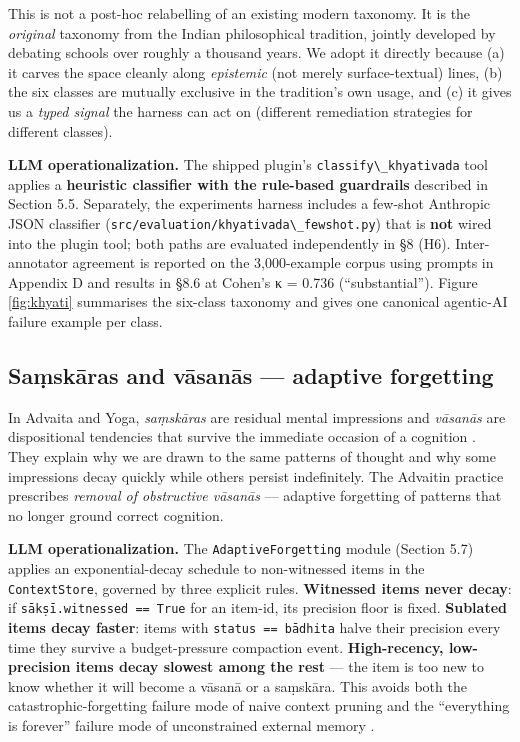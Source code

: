 This is not a post-hoc relabelling of an existing modern taxonomy. It is the \emph{original} taxonomy from the Indian philosophical tradition, jointly developed by debating schools over roughly a thousand years. We adopt it directly because (a) it carves the space cleanly along \emph{epistemic} (not merely surface-textual) lines, (b) the six classes are mutually exclusive in the tradition's own usage, and (c) it gives us a \emph{typed signal} the harness can act on (different remediation strategies for different classes).

\textbf{LLM operationalization.} The shipped plugin's \passthrough{\lstinline!classify\_khyativada!} tool applies a \textbf{heuristic classifier with the rule-based guardrails} described in Section 5.5. Separately, the experiments harness includes a few-shot Anthropic JSON classifier (\passthrough{\lstinline!src/evaluation/khyativada\_fewshot.py!}) that is \textbf{not} wired into the plugin tool; both paths are evaluated independently in §8 (H6). Inter-annotator agreement is reported on the 3,000-example corpus using prompts in Appendix D and results in §8.6 at Cohen's κ = 0.736 (``substantial''). Figure \ref{fig:khyati} summarises the six-class taxonomy and gives one canonical agentic-AI failure example per class.



\subsection{Saṃskāras and vāsanās --- adaptive forgetting}\label{saux1e43skux101ras-and-vux101sanux101s-adaptive-forgetting}

In Advaita and Yoga, \emph{saṃskāras} are residual mental impressions and \emph{vāsanās} are dispositional tendencies that survive the immediate occasion of a cognition \citep{deutsch1969advaita, sankaraupadesha, halbfass1991traditioncomparison}. They explain why we are drawn to the same patterns of thought and why some impressions decay quickly while others persist indefinitely. The Advaitin practice prescribes \emph{removal of obstructive vāsanās} --- adaptive forgetting of patterns that no longer ground correct cognition.

\textbf{LLM operationalization.} The \passthrough{\lstinline!AdaptiveForgetting!} module (Section 5.7) applies an exponential-decay schedule to non-witnessed items in the \passthrough{\lstinline!ContextStore!}, governed by three explicit rules. \textbf{Witnessed items never decay}: if \passthrough{\lstinline!sākṣī.witnessed == True!} for an item-id, its precision floor is fixed. \textbf{Sublated items decay faster}: items with \passthrough{\lstinline!status == bādhita!} halve their precision every time they survive a budget-pressure compaction event. \textbf{High-recency, low-precision items decay slowest among the rest} --- the item is too new to know whether it will become a vāsanā or a saṃskāra. This avoids both the catastrophic-forgetting failure mode of naive context pruning \citep{french1999catastrophic, kirkpatrick2017overcoming, parisi2019continual} and the ``everything is forever'' failure mode of unconstrained external memory \citep{packer2023memgpt}.

